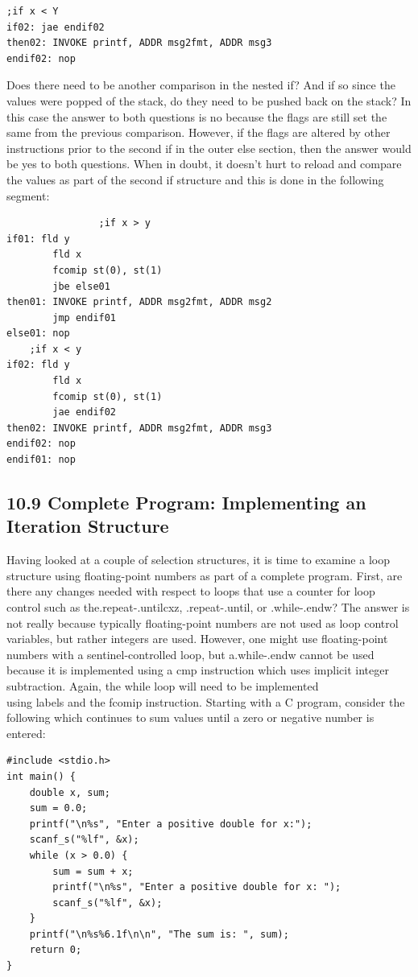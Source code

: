 \documentclass[10pt]{book}
\begin{document}
\begin{verbatim}
;if x < Y
if02: jae endif02
then02: INVOKE printf, ADDR msg2fmt, ADDR msg3
endif02: nop
\end{verbatim}

Does there need to be another comparison in the nested if? And if so since the values were popped of the stack, do they need to be pushed back on the stack? In this case the answer to both questions is no because the flags are still set the same from the previous comparison. However, if the flags are altered by other instructions prior to the second if in the outer else section, then the answer would be yes to both questions. When in doubt, it doesn't hurt to reload and compare the values as part of the second if structure and this is done in the following segment:

\begin{verbatim}
                ;if x > y
if01: fld y
        fld x
        fcomip st(0), st(1)
        jbe else01
then01: INVOKE printf, ADDR msg2fmt, ADDR msg2
        jmp endif01
else01: nop
    ;if x < y
if02: fld y
        fld x
        fcomip st(0), st(1)
        jae endif02
then02: INVOKE printf, ADDR msg2fmt, ADDR msg3
endif02: nop
endif01: nop
\end{verbatim}

\subsection*{10.9 Complete Program: Implementing an Iteration Structure}
Having looked at a couple of selection structures, it is time to examine a loop structure using floating-point numbers as part of a complete program. First, are there any changes needed with respect to loops that use a counter for loop control such as the.repeat-.untilcxz, .repeat-.until, or .while-.endw? The answer is not really because typically floating-point numbers are not used as loop control variables, but rather integers are used. However, one might use floating-point numbers with a sentinel-controlled loop, but a.while-.endw cannot be used because it is implemented using a cmp instruction which uses implicit integer subtraction. Again, the while loop will need to be implemented\\
using labels and the fcomip instruction. Starting with a C program, consider the following which continues to sum values until a zero or negative number is entered:


\begin{verbatim}
#include <stdio.h>
int main() {
    double x, sum;
    sum = 0.0;
    printf("\n%s", "Enter a positive double for x:");
    scanf_s("%lf", &x);
    while (x > 0.0) {
        sum = sum + x;
        printf("\n%s", "Enter a positive double for x: ");
        scanf_s("%lf", &x);
    }
    printf("\n%s%6.1f\n\n", "The sum is: ", sum);
    return 0;
}
\end{verbatim}
\end{document}
